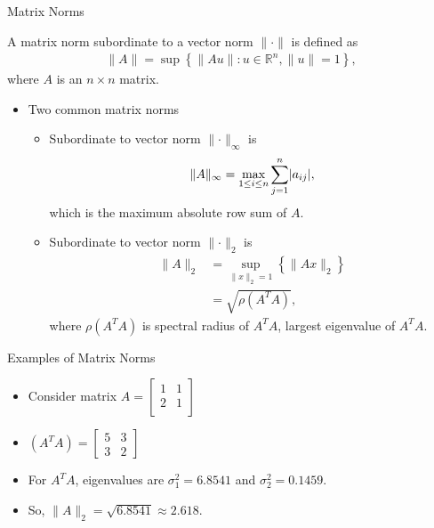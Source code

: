 \documentclass[9pt, serif]{beamer}
\newlength{\wideitemsep}
\let\olditem\item
\renewcommand{\item}{\setlength{\itemsep}{\wideitemsep}\olditem}
\newcommand{\bi}{\begin{itemize}}
\newcommand{\ei}{\end{itemize}}
\newcommand{\abs}[1]{\lvert#1\rvert}
\newcommand{\norm}[1]{\lVert#1\rVert}
\begin{document}
\begin{frame}{Matrix Norms}
    \begin{definition}
        A matrix norm subordinate to a vector norm $\norm{\cdot}$ is defined as
        \begin{align*}
            \norm{A} = \sup\left\{\norm{Au} : u\in\mathbb{R}^n , \norm{u} = 1\right\},
        \end{align*}
        where $A$ is an $n\times n$ matrix.
    \end{definition}
    \pause
    \bi
        \item Two common matrix norms
        \pause
        \bi
            \item Subordinate to vector norm $\norm{\cdot}_\infty$ is
            \begin{align*}
                \norm{A}_\infty = \smash{\displaystyle\max_{1 \leq i \leq n}} \sum\limits_{j=1}^n \abs{a_{ij}},
            \end{align*}
            which is the maximum absolute row sum of $A$.
            \pause

            \item Subordinate to vector norm $\norm{\cdot}_2$ is
            \begin{align*}
                \norm{A}_2 &= \sup\limits_{\norm{x}_2=1} \left\{\norm{Ax}_2\right\}\\
                &= \sqrt{\rho(A^TA)},
            \end{align*}
            where $\rho(A^TA)$ is spectral radius of $A^TA$, largest eigenvalue of $A^TA$.
        \ei
    \ei
\end{frame}


\begin{frame}{Examples of Matrix Norms}
    \bi
        \item Consider matrix
        $A = \begin{bmatrix}
            1 & 1 \\
            2 & 1\\
        \end{bmatrix}$
        \pause
        \item$(A^TA) = \begin{bmatrix} 5 & 3 \\ 3 & 2 \end{bmatrix}$
        \pause
        \item For $A^TA$, eigenvalues are $\sigma^2_1 = 6.8541$ and $\sigma^2_2 = 0.1459$.
        \pause
        \item So, $\norm{A}_2 = \sqrt{6.8541} \approx 2.618$.
    \ei
\end{frame}
\end{document}
